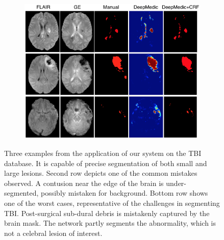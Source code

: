 \begin{figure}[!ht]
\centering
\begin{subfigure}[b]{1.0\textwidth}
	\centering
	\includegraphics[clip=true, trim=0pt 0pt 0pt 0pt, width=1.0\textwidth]{figures/evaluationSection/tbi/visualsQualitatively/visualsQualitatively4.png}
\end{subfigure}
\vspace{-10pt} %
\caption{Three examples from the application of our system on the TBI database. It is capable of precise segmentation of both small and large lesions. Second row depicts one of the common mistakes observed. A contusion near the edge of the brain is under-segmented, possibly mistaken for background. Bottom row shows one of the worst cases, representative of the challenges in segmenting TBI. Post-surgical sub-dural debris is mistakenly captured by the brain mask. The network partly segments the abnormality, which is not a celebral lesion of interest.}
\label{fig:evalTbiVisualQuality}
\end{figure}
